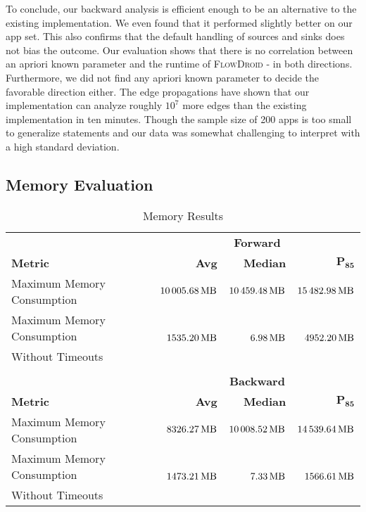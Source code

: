 \documentclass[../draft.tex]{subfiles}
\begin{document}
    To conclude, our backward analysis is efficient enough to be an alternative to the existing implementation.
    We even found that it performed slightly better on our app set.
    This also confirms that the default handling of sources and sinks does not bias the outcome.
    Our evaluation shows that there is no correlation between an apriori known parameter and the runtime of \textsc{FlowDroid} - in both directions.
    Furthermore, we did not find any apriori known parameter to decide the favorable direction either.
    The edge propagations have shown that our implementation can analyze roughly $10^7$ more edges than the existing implementation in ten minutes. 
    Though the sample size of 200 apps is too small to generalize statements and our data was somewhat challenging to interpret with a high standard deviation.

    \FloatBarrier
    \subsection{Memory Evaluation}\label{s:memex}

    \begin{table}[tbp]
        \centering
        \begin{tabular}{l | r | r | r}
            & \multicolumn{3}{c}{\textbf{Forward}}\\
            \textbf{Metric} & \textbf{Avg} & \textbf{Median} & $\mathbf{P_{85}}$\\
            \hline\hline
            Maximum Memory Consumption & $\SI{10005.68}{\mega\byte}$ & $\SI{10459.48}{\mega\byte}$ & $\SI{15482.98}{\mega\byte}$\\
            \hline
            Maximum Memory Consumption & \multirow{2}{*}{$\SI{1535.20}{\mega\byte}$} & \multirow{2}{*}{$\SI{6.98}{\mega\byte}$} & \multirow{2}{*}{$\SI{4952.20}{\mega\byte}$}\\
            Without Timeouts & & &\\            
            \multicolumn{4}{c}{}\\
            & \multicolumn{3}{c}{\textbf{Backward}}\\
            \textbf{Metric} & \textbf{Avg} & \textbf{Median} & $\mathbf{P_{85}}$\\
            \hline\hline
            Maximum Memory Consumption & $\SI{8326.27}{\mega\byte}$ & $\SI{10008.52}{\mega\byte}$ & $\SI{14539.64}{\mega\byte}$\\
            \hline
            Maximum Memory Consumption & \multirow{2}{*}{$\SI{1473.21}{\mega\byte}$} & \multirow{2}{*}{$\SI{7.33}{\mega\byte}$} & \multirow{2}{*}{$\SI{1566.61}{\mega\byte}$}\\
            Without Timeouts & & &\\
        \end{tabular}
        \caption{Memory Results}
        \label{t:memres}
    \end{table}
\end{document}
